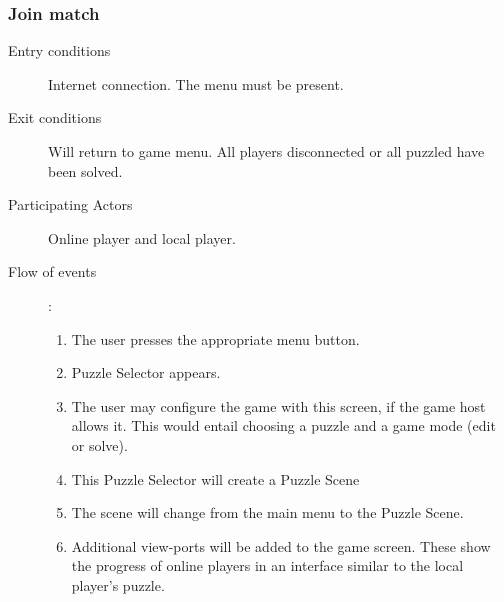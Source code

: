 \documentclass[12pt]{article}
\begin{document}
\begin{mdframed}
    \subsubsection{Join match}
    \begin{description}
        \item[Entry conditions] Internet connection. The menu must be present.
        \item[Exit conditions] Will return to game menu. All players
            disconnected or all puzzled have been solved.
        \item[Participating Actors] Online player and local player.
        \item[Flow of events]:
            \begin{enumerate}
                \item The user presses the appropriate menu button.
                \item Puzzle Selector appears.
                \item The user may configure the game with this screen, if
                    the game host allows it. This would
                    entail choosing a puzzle and a game mode (edit or solve).
                \item This Puzzle Selector will create a Puzzle Scene
                \item The scene will change from the main menu to the Puzzle
                    Scene.
                \item Additional view-ports will be added to the game screen.
                These show the progress of online players in an interface
                similar to the local player's puzzle.
            \end{enumerate}
    \end{description}
\end{mdframed}
\end{document}
